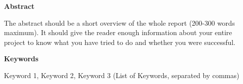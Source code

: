 \onehalfspacing
{}
{\fontsize{16pt}{30pt}\selectfont \noindent\textbf{Abstract}}
\vspace{0.5cm}
{\fontsize{12pt}{18pt}\selectfont

The abstract should be a short overview of the whole report (200-300 words maximum). It should give the reader enough information about your entire project to know what you have tried to do and whether you were successful.

}
\vspace{0.5cm}
{\fontsize{16pt}{30pt}\selectfont \noindent\textbf{Keywords}}
\vspace{0.5cm}
{\fontsize{12pt}{18pt}\selectfont

Keyword 1, Keyword 2, Keyword 3 (List of Keywords, separated by commas)

}

